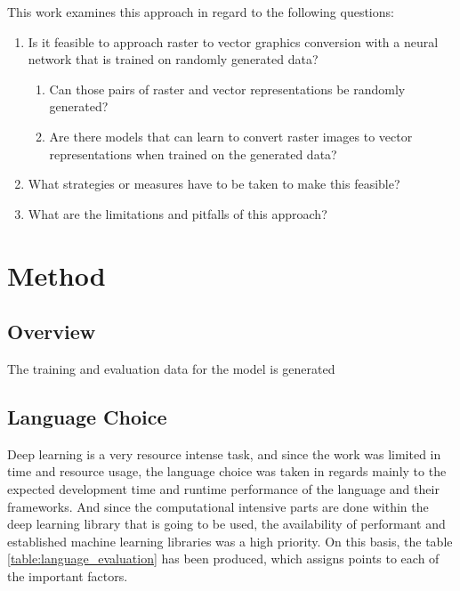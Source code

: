 \documentclass[12pt, a4paper, titlepage]{report}
\begin{document}
This work examines this approach in regard to the following questions:

\begin{enumerate}[label=\Roman*]
   \item Is it feasible to approach raster to vector graphics conversion with a neural network that is trained on randomly generated data?
   \begin{enumerate}
      \item Can those pairs of raster and vector representations be randomly generated?
      \item Are there models that can learn to convert raster images to vector representations when trained on the generated data?
   \end{enumerate}
   \item What strategies or measures have to be taken to make this feasible?
   \item What are the limitations and pitfalls of this approach?
\end{enumerate}


\chapter{Method}

\section{Overview}

The training and evaluation data for the model is generated 

\section{Language Choice}

Deep learning is a very resource intense task, and since the work was limited in time and resource usage, the language choice was taken in regards mainly to the expected development time and runtime performance of the language and their frameworks. And since the computational intensive parts are done within the deep learning library that is going to be used, the availability of performant and established machine learning libraries was a high priority. On this basis, the table \ref{table:language_evaluation} has been produced, which assigns points to each of the important factors. 
\end{document}
